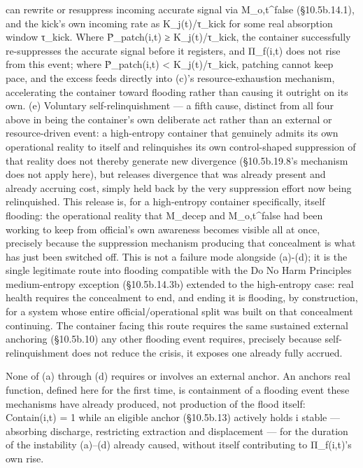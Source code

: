 \documentclass[
]{article}
\begin{document}
can rewrite or resuppress incoming accurate signal via M\_o,t\^{}false
(§10.5b.14.1), and the kick's own incoming rate as K\_j(t)/τ\_kick for
some real absorption window τ\_kick. Where Ṗ\_patch(i,t) ≥
K\_j(t)/τ\_kick, the container successfully re-suppresses the accurate
signal before it registers, and Π\_f(i,t) does not rise from this event;
where Ṗ\_patch(i,t) \textless{} K\_j(t)/τ\_kick, patching cannot keep
pace, and the excess feeds directly into (c)'s resource-exhaustion
mechanism, accelerating the container toward flooding rather than
causing it outright on its own. (e) Voluntary self-relinquishment --- a
fifth cause, distinct from all four above in being the container's own
deliberate act rather than an external or resource-driven event: a
high-entropy container that genuinely admits its own operational reality
to itself and relinquishes its own control-shaped suppression of that
reality does not thereby generate new divergence (§10.5b.19.8's mechanism
does not apply here), but releases divergence that was already present
and already accruing cost, simply held back by the very suppression
effort now being relinquished. This release is, for a high-entropy
container specifically, itself flooding: the operational reality that
M\_decep and M\_o,t\^{}false had been working to keep from official's own
awareness becomes visible all at once, precisely because the suppression
mechanism producing that concealment is what has just been switched off.
This is not a failure mode alongside (a)-(d); it is the single
legitimate route into flooding compatible with the Do No Harm Principles
medium-entropy exception (§10.5b.14.3b) extended to the high-entropy
case: real health requires the concealment to end, and ending it is
flooding, by construction, for a system whose entire
official/operational split was built on that concealment continuing. The
container facing this route requires the same sustained external
anchoring (§10.5b.10) any other flooding event requires, precisely
because self-relinquishment does not reduce the crisis, it exposes one
already fully accrued.

None of (a) through (d) requires or involves an external anchor. An
anchors real function, defined here for the first time, is containment
of a flooding event these mechanisms have already produced, not
production of the flood itself: Contain(i,t) = 1 while an eligible
anchor (§10.5b.13) actively holds i stable --- absorbing discharge,
restricting extraction and displacement --- for the duration of the
instability (a)--(d) already caused, without itself contributing to
Π\_f(i,t)'s own rise.
\end{document}
